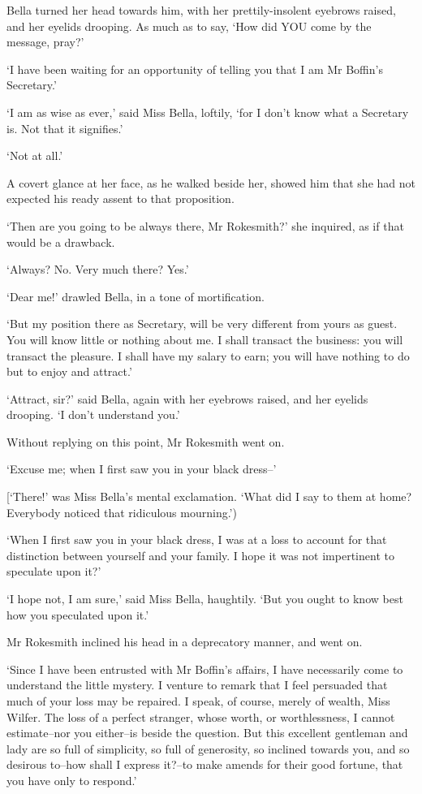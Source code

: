 Bella turned her head towards him, with her prettily-insolent eyebrows
raised, and her eyelids drooping. As much as to say, ‘How did YOU come
by the message, pray?’

‘I have been waiting for an opportunity of telling you that I am Mr
Boffin’s Secretary.’

‘I am as wise as ever,’ said Miss Bella, loftily, ‘for I don’t know what
a Secretary is. Not that it signifies.’

‘Not at all.’

A covert glance at her face, as he walked beside her, showed him that
she had not expected his ready assent to that proposition.

‘Then are you going to be always there, Mr Rokesmith?’ she inquired, as
if that would be a drawback.

‘Always? No. Very much there? Yes.’

‘Dear me!’ drawled Bella, in a tone of mortification.

‘But my position there as Secretary, will be very different from yours
as guest. You will know little or nothing about me. I shall transact
the business: you will transact the pleasure. I shall have my salary to
earn; you will have nothing to do but to enjoy and attract.’

‘Attract, sir?’ said Bella, again with her eyebrows raised, and her
eyelids drooping. ‘I don’t understand you.’

Without replying on this point, Mr Rokesmith went on.

‘Excuse me; when I first saw you in your black dress--’

[‘There!’ was Miss Bella’s mental exclamation. ‘What did I say to them
at home? Everybody noticed that ridiculous mourning.’)

‘When I first saw you in your black dress, I was at a loss to account
for that distinction between yourself and your family. I hope it was not
impertinent to speculate upon it?’

‘I hope not, I am sure,’ said Miss Bella, haughtily. ‘But you ought to
know best how you speculated upon it.’

Mr Rokesmith inclined his head in a deprecatory manner, and went on.

‘Since I have been entrusted with Mr Boffin’s affairs, I have
necessarily come to understand the little mystery. I venture to remark
that I feel persuaded that much of your loss may be repaired. I
speak, of course, merely of wealth, Miss Wilfer. The loss of a perfect
stranger, whose worth, or worthlessness, I cannot estimate--nor you
either--is beside the question. But this excellent gentleman and lady
are so full of simplicity, so full of generosity, so inclined towards
you, and so desirous to--how shall I express it?--to make amends for
their good fortune, that you have only to respond.’

